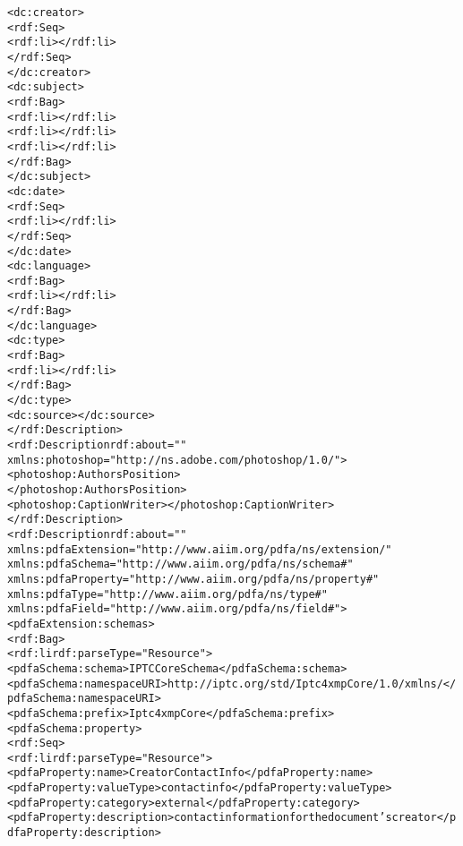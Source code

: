 \begin{alltt}
             <dc:creator>
                <rdf:Seq>
                   <rdf:li></rdf:li>
                </rdf:Seq>
             </dc:creator>
             <dc:subject>
                <rdf:Bag>
                   <rdf:li></rdf:li>
                   <rdf:li></rdf:li>
                   <rdf:li></rdf:li>
                </rdf:Bag>
             </dc:subject>
             <dc:date>
                <rdf:Seq>
                   <rdf:li></rdf:li>
                </rdf:Seq>
             </dc:date>
             <dc:language>
                <rdf:Bag>
                   <rdf:li></rdf:li>
                </rdf:Bag>
              </dc:language>
              <dc:type>
                 <rdf:Bag>
                    <rdf:li></rdf:li>
                 </rdf:Bag>
              </dc:type>
             <dc:source></dc:source>
          </rdf:Description>
          <rdf:Description rdf:about=""
                xmlns:photoshop="http://ns.adobe.com/photoshop/1.0/">
             <photoshop:AuthorsPosition>
             </photoshop:AuthorsPosition>
             <photoshop:CaptionWriter></photoshop:CaptionWriter>
          </rdf:Description>
          <rdf:Description rdf:about=""
              xmlns:pdfaExtension="http://www.aiim.org/pdfa/ns/extension/"
              xmlns:pdfaSchema="http://www.aiim.org/pdfa/ns/schema#"
              xmlns:pdfaProperty="http://www.aiim.org/pdfa/ns/property#"
              xmlns:pdfaType="http://www.aiim.org/pdfa/ns/type#"
              xmlns:pdfaField="http://www.aiim.org/pdfa/ns/field#">
            <pdfaExtension:schemas>
              <rdf:Bag>
                <rdf:li rdf:parseType="Resource">
                  <pdfaSchema:schema>IPTC Core Schema</pdfaSchema:schema>
                  <pdfaSchema:namespaceURI>http://iptc.org/std/Iptc4xmpCore/1.0/xmlns/</pdfaSchema:namespaceURI>
                  <pdfaSchema:prefix>Iptc4xmpCore</pdfaSchema:prefix>
                  <pdfaSchema:property>
                    <rdf:Seq>
                      <rdf:li rdf:parseType="Resource">
                        <pdfaProperty:name>CreatorContactInfo</pdfaProperty:name>
                        <pdfaProperty:valueType>contactinfo</pdfaProperty:valueType>
                        <pdfaProperty:category>external</pdfaProperty:category>
                        <pdfaProperty:description>contact information for the document's creator</pdfaProperty:description>

\end{alltt}
